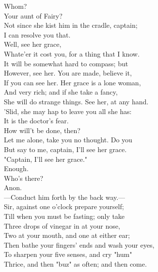 \documentclass[a4paper,oneside]{memoir}
\begin{document}
\begin{drama*}
\dapperspeaks {} Whom?\\
\facespeaks {} Your aunt of Fairy?\\
\subtlespeaks Not since she kist him in the cradle, captain;\\
I can resolve you that.\\
\facespeaks {} Well, see her grace,\\
Whate'er it cost you, for a thing that I know.\\
It will be somewhat hard to compass; but\\
However, see her. You are made, believe it,\\
If you can see her. Her grace is a lone woman,\\
And very rich; and if she take a fancy,\\
She will do strange things. See her, at any hand.\\
'Slid, she may hap to leave you all she has:\\
It is the doctor's fear.\\
\dapperspeaks {} How will't be done, then?\\
\facespeaks Let me alone, take you no thought. Do you\\
But say to me, captain, I'll see her grace.\\
\dapperspeaks "Captain, I'll see her grace."\\
\facespeaks {} Enough.\\
\subtlespeaks {} Who's there?\\
Anon.\\
 ---Conduct him forth by the back way.---\\
Sir, against one o'clock prepare yourself;\\
Till when you must be fasting; only take\\
Three drops of vinegar in at your nose,\\
Two at your mouth, and one at either ear;\\
Then bathe your fingers' ends and wash your eyes,\\
To sharpen your five senses, and cry "hum"\\
Thrice, and then "buz" as often; and then come.\\

\end{drama*}
\end{document}
